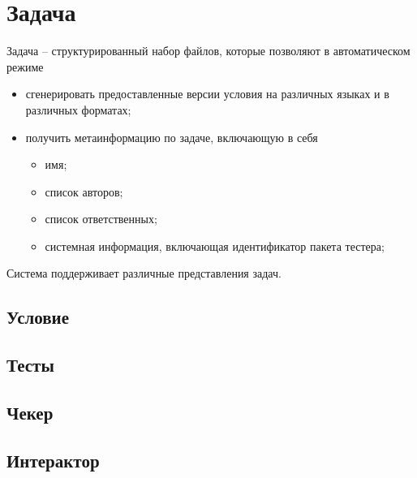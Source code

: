 \section{Задача}
Задача -- структурированный набор файлов,
которые позволяют в автоматическом режиме
\begin{itemize}
    \item сгенерировать предоставленные версии условия
        на различных языках и в различных форматах;
    \item получить метаинформацию по задаче, включающую в себя
        \begin{itemize}
            \item имя;
            \item список авторов;
            \item список ответственных;
            \item системная информация, включающая идентификатор пакета тестера;
        \end{itemize}
\end{itemize}

Система поддерживает различные представления задач.

\subsection{Условие}

\subsection{Тесты}

\subsection{Чекер}

\subsection{Интерактор}
